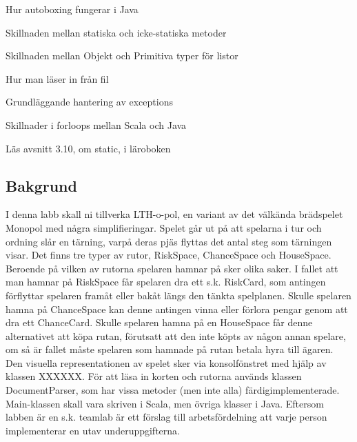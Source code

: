 

\Lab{\LabWeekELEVEN}

\begin{Goals}
\item Hur autoboxing fungerar i Java
\item Skillnaden mellan statiska och icke-statiska metoder
\item Skillnaden mellan Objekt och Primitiva typer för listor
\item Hur man läser in från fil
\item Grundläggande hantering av exceptions
\item Skillnader i forloops mellan Scala och Java

\end{Goals}

\begin{Preparations}
\item Läs avsnitt 3.10, om static, i läroboken
\end{Preparations}

\subsection{Bakgrund}
I denna labb skall ni tillverka LTH-o-pol, en variant av det välkända brädspelet Monopol med några simplifieringar. Spelet går ut på att spelarna i tur och ordning slår en tärning, varpå deras pjäs flyttas det antal steg som tärningen visar. Det finns tre typer av rutor, RiskSpace, ChanceSpace och HouseSpace. Beroende på vilken av rutorna spelaren hamnar på sker olika saker. I fallet att man hamnar på RiskSpace får spelaren dra ett s.k. RiskCard, som antingen förflyttar spelaren framåt eller bakåt längs den tänkta spelplanen. Skulle spelaren hamna på ChanceSpace kan denne antingen vinna eller förlora pengar genom att dra ett ChanceCard. Skulle spelaren hamna på en HouseSpace får denne alternativet att köpa rutan, förutsatt att den inte köpts av någon annan spelare, om så är fallet måste spelaren som hamnade på rutan betala hyra till ägaren.
Den visuella representationen av spelet sker via konsolfönstret med hjälp av klassen XXXXXX. 
För att läsa in korten och rutorna används klassen DocumentParser, som har vissa metoder (men inte alla) färdigimplementerade.
Main-klassen skall vara skriven i Scala, men övriga klasser i Java. 
Eftersom labben är en s.k. teamlab är ett förslag till arbetsfördelning att varje person implementerar en utav underuppgifterna.


